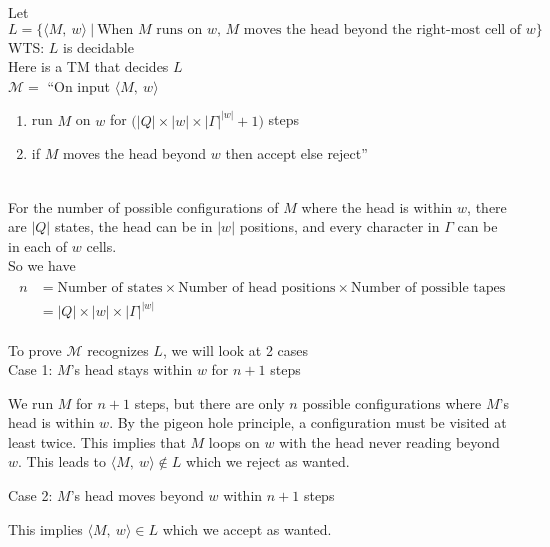 \documentclass[preview]{standalone} %
\begin{document}
Let $L = \{\langle M,\ w\rangle\ |\ \text{When $M$ runs on $w$, $M$ moves the head beyond the right-most cell of $w$}\}$\\

WTS: $L$ is decidable\\

Here is a TM that decides $L$\\
$\mathcal{M} = $ ``On input $\langle M,\ w\rangle$
\begin{enumerate}[leftmargin=14mm, nosep, label=\textbf{\arabic*}.]
    \item run $M$ on $w$ for $\big(|Q|\times|w|\times|\Gamma|^{|w|} + 1\big)$ steps
    \item if $M$ moves the head beyond $w$ then accept else reject''
\end{enumerate}~\\
For the number of possible configurations of $M$ where the head is within $w$, there are $|Q|$ states,
the head can be in $|w|$ positions, and every character in $\Gamma$ can be in each of $w$ cells.\\

So we have
\begin{align*}\begin{split}
    n & = \text{Number of states} \times \text{Number of head positions} \times \text{Number of possible tapes} \\
      & = |Q|\times|w|\times|\Gamma|^{|w|}
\end{split}\end{align*}

To prove $\mathcal{M}$ recognizes $L$, we will look at 2 cases\\
Case 1: $M$'s head stays within $w$ for $n+1$ steps
\begin{adjustwidth}{10mm}{}
    We run $M$ for $n+1$ steps, but there are only $n$ possible configurations where $M$'s head is within $w$.
    By the pigeon hole principle, a configuration must be visited at least twice. This implies that $M$
    loops on $w$ with the head never reading beyond $w$. This leads to $\langle M,\ w\rangle \not \in L$
    which we reject as wanted.
\end{adjustwidth}
Case 2: $M$'s head moves beyond $w$ within $n+1$ steps
\begin{adjustwidth}{10mm}{}
    This implies $\langle M,\ w\rangle \in L$ which we accept as wanted.
\end{adjustwidth}
\end{document}
